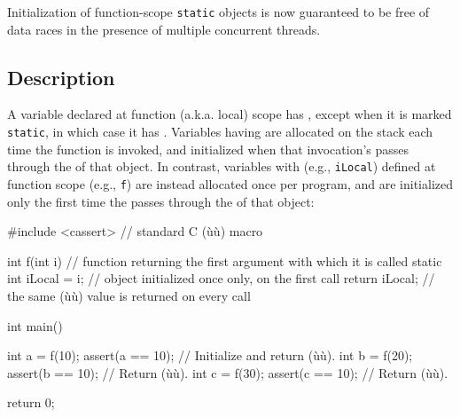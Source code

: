 


\setcounter{table}{0}
\setcounter{footnote}{0}
\setcounter{lstlisting}{0}


Initialization of function-scope \lstinline!static! objects is now guaranteed to be
free of data races in the presence
of multiple concurrent threads.

\subsection[Description]{Description}\label{description-functionstatic}

A variable declared at function (a.k.a. local) scope has , 
except when it is marked \lstinline!static!, in which case it has .
Variables having  are allocated on the stack
each time the function is invoked, and initialized when that invocation's 
passes through the  of that object.
In contrast, variables with  (e.g., \lstinline!iLocal!)
defined at function scope (e.g., \lstinline!f!) are instead allocated once per program, and are initialized
only the first time the  passes
through the  of that object:

\begin{emcppslisting}
#include <cassert>  // standard C (ù{}ù) macro

int f(int i) // function returning the first argument with which it is called
{
    static int iLocal = i;  // object initialized once only, on the first call
    return iLocal;          // the same (ù{}ù) value is returned on every call
}

int main()
{
    int a = f(10);  assert(a == 10);  // Initialize and return (ù{}ù).
    int b = f(20);  assert(b == 10);  // Return (ù{}ù).
    int c = f(30);  assert(c == 10);  // Return (ù{}ù).

    return 0;
}
\end{emcppslisting}

